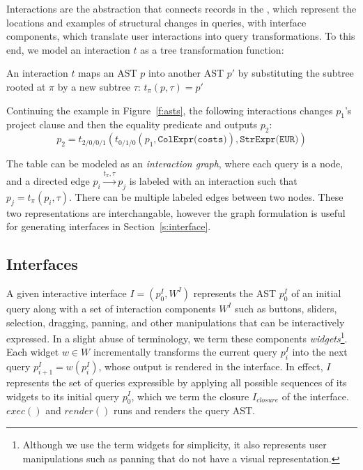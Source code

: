  Interactions are the abstraction that connects records in the \difftable, which represent the locations and examples of structural changes in queries, with interface components, which translate user interactions into query transformations.  To this end, we model an interaction $t$ as a tree transformation function:
\begin{definition}
An interaction $t$ maps an AST $p$ into another AST $p'$ by substituting the subtree rooted at $\pi$ by a new subtree $\tau$:
  $t_{\pi}(p, \tau) = p'$
\end{definition}

\begin{example}
Continuing the example in Figure~\ref{f:asts}, the following interactions changes $p_1$'s project clause and then the equality predicate and outputs $p_2$:
$$p_2 = t_{2/0/0/1}(t_{0/1/0}(p_1, \texttt{ColExpr(costs)}), \texttt{StrExpr(EUR)}) $$
\end{example}


 The table \difftable can be modeled as an {\it interaction graph}, where each query is a node, and a directed edge $p_i \xrightarrow{t_\pi, \tau} p_j$ is labeled with an interaction such that $p_j = t_\pi(p_i, \tau)$.  There can be multiple labeled edges between two nodes.  These two representations are interchangable, however the graph formulation is useful for generating interfaces in Section~\ref{s:interface}.

\subsection{Interfaces}

A given interactive interface $I = (p^I_0, W^I)$ represents the AST $p^I_0$ of an initial query  along with a set of interaction components $W^I$ such as buttons, sliders, selection, dragging, panning, and other manipulations that can be interactively expressed. In a slight abuse of terminology, we term these components {\it widgets}\footnote{\small Although we use the term widgets for simplicity, it also represents user manipulations such as panning that do not have a visual representation.}.  Each widget $w \in W$ incrementally transforms the current query $p^I_i$ into the next query $p^I_{i+1} = w(p^I_i)$, whose output is rendered in the interface. In effect, $I$ represents the set of queries expressible by applying all possible sequences of its widgets to its initial query $p^I_0$, which we term the closure $I_{closure}$ of the interface.  $exec()$ and $render()$ runs and renders the query AST.


